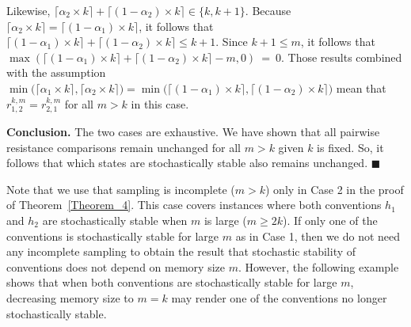 Likewise, $\lceil \alpha_2 \times k \rceil+\lceil (1-\alpha_2) \times k \rceil \in \{k, k+1\}$. Because $\lceil \alpha_2 \times k \rceil = \lceil (1-\alpha_1) \times k \rceil$, it follows that $\lceil (1-\alpha_1) \times k \rceil+\lceil (1-\alpha_2) \times k \rceil \leq k+1$. Since $k+1 \leq m$, it follows that $\max(\lceil (1-\alpha_1) \times k \rceil+\lceil (1-\alpha_2) \times k \rceil-m,0)~=~0$.
Those results combined with the assumption $\min\big(\lceil \alpha_1 \times k \rceil,\lceil \alpha_2 \times k \rceil\big) = \min\big(\lceil (1-\alpha_1) \times k \rceil,\lceil (1-\alpha_2) \times k \rceil\big)$ mean that $r^{k,m}_{1,2} = r^{k,m}_{2,1}$ for all $m > k$ in this case.

{\bf Conclusion.} The two cases are exhaustive. We have shown that all pairwise resistance comparisons remain unchanged for all $m > k$ given $k$ is fixed. So, it follows that which states are stochastically stable also remains unchanged.
$\blacksquare$

Note that we use that sampling is incomplete ($m>k$) only in Case 2 in the proof of Theorem~\ref{Theorem_4}. This case covers instances where both conventions $h_1$ and $h_2$ are stochastically stable when $m$ is large ($m\geq 2k$). If only one of the conventions is stochastically stable for large $m$ as in Case 1, then we do not need any incomplete sampling to obtain the result that stochastic stability of conventions does not depend on memory size $m$. However, the following example shows that when both conventions are stochastically stable for large $m$, decreasing memory size to $m=k$ may render one of the conventions no longer stochastically stable.


